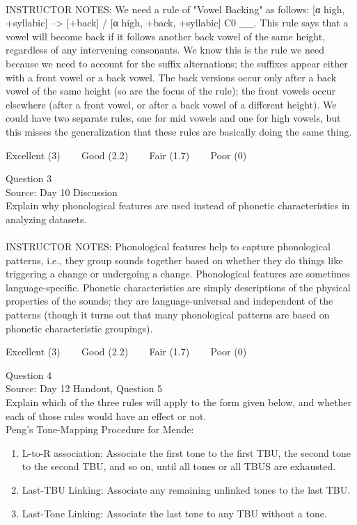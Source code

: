 \documentclass[12pt]{article}
\begin{document}
~\\
INSTRUCTOR NOTES: We need a rule of "Vowel Backing" as follows: [α high, +syllabic] --> [+back] / [α high, +back, +syllabic] C0 \_\_. This rule says that a vowel will become back if it follows another back vowel of the same height, regardless of any intervening consonants. We know this is the rule we need because we need to account for the suffix alternations; the suffixes appear either with a front vowel or a back vowel. The back versions occur only after a back vowel of the same height (so are the focus of the rule); the front vowels occur elsewhere (after a front vowel, or after a back vowel of a different height). We could have two separate rules, one for mid vowels and one for high vowels, but this misses the generalization that these rules are basically doing the same thing.


\vfill
Excellent (3) ~~~ Good (2.2) ~~~ Fair (1.7) ~~~ Poor (0)
\newpage

{\large Question 3}\\

Source: Day 10 Discussion\\

Explain why phonological features are used instead of phonetic characteristics in analyzing datasets.\\


~\\
INSTRUCTOR NOTES: Phonological features help to capture phonological patterns, i.e., they group sounds together based on whether they do things like triggering a change or undergoing a change. Phonological features are sometimes language-specific. Phonetic characteristics are simply descriptions of the physical properties of the sounds; they are language-universal and independent of the patterns (though it turns out that many phonological patterns are based on phonetic characteristic groupings).


\vfill
Excellent (3) ~~~ Good (2.2) ~~~ Fair (1.7) ~~~ Poor (0)
\newpage

{\large Question 4}\\

Source: Day 12 Handout, Question 5\\

Explain which of the three rules will apply to the form given below, and whether each of those rules would have an effect or not.\\

Peng’s Tone-Mapping Procedure for Mende: \begin{enumerate} \item L-to-R association: Associate the first tone to the first TBU, the second tone to the second TBU, and so on, until all tones or all TBUS are exhausted. \item Last-TBU Linking: Associate any remaining unlinked tones to the last TBU. \item Last-Tone Linking: Associate the last tone to any TBU without a tone. \end{enumerate}
\end{document}
